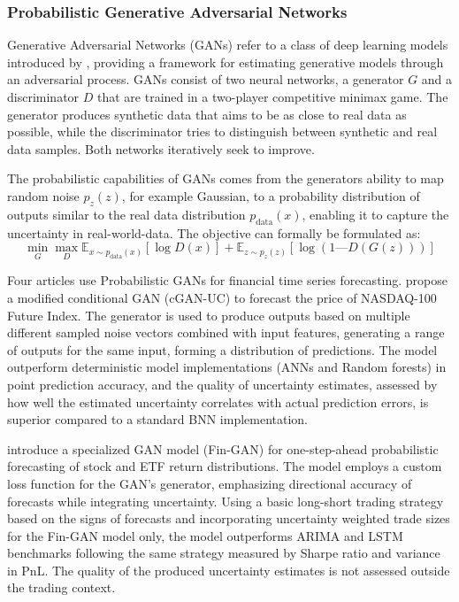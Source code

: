 \subsubsection[Probabilistic Generative Adversarial Networks (P-GAN)]{Probabilistic Generative Adversarial Networks}
Generative Adversarial Networks (GANs) refer to a class of deep learning models introduced by \textcite{goodfellow2014gan}, providing a framework for estimating generative models through an adversarial process. GANs consist of two neural networks, a generator $G$ and a discriminator $D$ that are trained in a two-player competitive minimax game.
The generator produces synthetic data that aims to be as close to real data as possible, while the discriminator tries to distinguish between synthetic and real data samples. Both networks iteratively seek to improve. 

The probabilistic capabilities of GANs comes from the generators ability to map random noise $p_z(z)$, for example Gaussian, to a probability distribution of outputs similar to the real data distribution $p_{\text{data}}(x)$, enabling it to capture the uncertainty in real-world-data. The objective can formally be formulated as: 
\begin{equation}
\min_{G} \max_{D}  \mathbb{E}_{x \sim p_{\text{data}}(x)}[\log D(x)] + \mathbb{E}_{z \sim p_z(z)}[\log (1—D(G(z)))]
\end{equation} 

Four articles use Probabilistic GANs for financial time series forecasting. \textcite{lee2021estimation} propose a modified conditional GAN (cGAN-UC) to forecast the price of NASDAQ-100 Future Index. The generator is used to produce outputs based on multiple different sampled noise vectors combined with input features, generating a range of outputs for the same input, forming a distribution of predictions. The model outperform deterministic model implementations (ANNs and Random forests) in point prediction accuracy, and the quality of uncertainty estimates, assessed by how well the estimated uncertainty correlates with actual prediction errors, is superior compared to a standard BNN implementation. 

\textcite{vuletic2024finGAN} introduce a specialized GAN model (Fin-GAN) for one-step-ahead probabilistic forecasting of stock and ETF return distributions. The model employs a custom loss function for the GAN's generator, emphasizing directional accuracy of forecasts while integrating uncertainty. Using a basic long-short trading strategy based on the signs of forecasts and incorporating uncertainty weighted trade sizes for the Fin-GAN model only, the model outperforms ARIMA and LSTM benchmarks following the same strategy measured by Sharpe ratio and variance in PnL. The quality of the produced uncertainty estimates is not assessed outside the trading context.  

